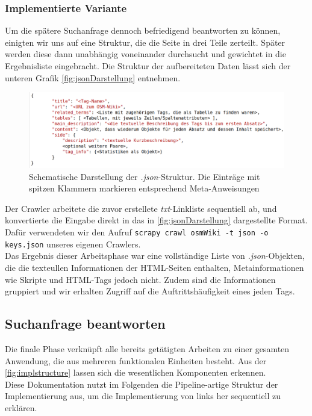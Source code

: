 \documentclass[12pt,pdftex,a4paper]{article}
\begin{document}
\subsubsection{Implementierte Variante}
Um die spätere Suchanfrage dennoch befriedigend beantworten zu können, einigten wir uns auf eine Struktur, die die Seite in drei Teile zerteilt. Später werden diese dann unabhängig voneinander durchsucht und gewichtet in die Ergebnisliste eingebracht. Die Struktur der aufbereiteten Daten lässt sich der unteren Grafik \autoref{fig:jsonDarstellung} entnehmen.\\
\begin{figure}[h]
	\centering
	\includegraphics[width=0.9\linewidth]{Bilder/json_structure}
	\caption[Schematische Darstellung]{Schematische Darstellung der \textit{.json}-Struktur. Die Einträge mit spitzen Klammern markieren entsprechend Meta-Anweisungen}
	\label{fig:jsonDarstellung}
\end{figure}
Der Crawler arbeitete die zuvor erstellete \textit{txt}-Linkliste sequentiell ab, und konvertierte die Eingabe direkt in das in \autoref{fig:jsonDarstellung} dargestellte Format.\\
Dafür verwendeten wir den Aufruf \texttt{scrapy crawl osmWiki -t json -o keys.json} unseres eigenen Crawlers.\\
 Das Ergebnis dieser Arbeitsphase war eine vollständige Liste von \textit{.json}-Objekten, die die texteullen Informationen der HTML-Seiten enthalten, Metainformationen wie Skripte und HTML-Tags jedoch nicht. Zudem sind die Informationen gruppiert und wir erhalten Zugriff auf die Auftrittshäufigkeit eines jeden Tags.

\subsection{Suchanfrage beantworten}
Die finale Phase verknüpft alle bereits getätigten Arbeiten zu einer gesamten Anwendung, die aus mehreren funktionalen Einheiten besteht. Aus der \autoref{fig:implstructure} lassen sich die wesentlichen Komponenten erkennen. \\
Diese Dokumentation nutzt im Folgenden die Pipeline-artige Struktur der Implementierung aus, um die Implementierung von links her sequentiell zu erklären.
\end{document}
